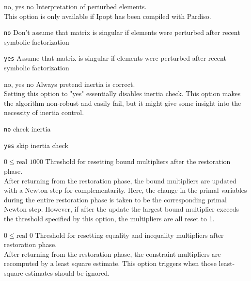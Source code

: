 %
{\ttfamily no, yes}%
{no}%
{Interpretation of perturbed elements.\\
This option is only available if Ipopt has been compiled with Pardiso.}%
{\begin{list}{}{
\setlength{\parsep}{0em}
\setlength{\leftmargin}{5ex}
\setlength{\labelwidth}{2ex}
\setlength{\itemindent}{0ex}
\setlength{\topsep}{0pt}}
\item[\texttt{no}] Don't assume that matrix is singular if elements were perturbed after recent symbolic factorization
\item[\texttt{yes}] Assume that matrix is singular if elements were perturbed after recent symbolic factorization
\end{list}
}

%
{\ttfamily no, yes}%
{no}%
{Always pretend inertia is correct.\\
Setting this option to "yes" essentially disables inertia check. This option makes the algorithm non-robust and easily fail, but it might give some insight into the necessity of inertia control.}%
{\begin{list}{}{
\setlength{\parsep}{0em}
\setlength{\leftmargin}{5ex}
\setlength{\labelwidth}{2ex}
\setlength{\itemindent}{0ex}
\setlength{\topsep}{0pt}}
\item[\texttt{no}] check inertia
\item[\texttt{yes}] skip inertia check
\end{list}
}

%
{$0\leq\textrm{real}$}%
{$1000$}%
{Threshold for resetting bound multipliers after the restoration phase.\\
After returning from the restoration phase, the bound multipliers are updated with a Newton step for complementarity.  Here, the change in the primal variables during the entire restoration phase is taken to be the corresponding primal Newton step. However, if after the update the largest bound multiplier exceeds the threshold specified by this option, the multipliers are all reset to 1.}%
{}

%
{$0\leq\textrm{real}$}%
{$0$}%
{Threshold for resetting equality and inequality multipliers after restoration phase.\\
After returning from the restoration phase, the constraint multipliers are recomputed by a least square estimate.  This option triggers when those least-square estimates should be ignored.}%
{}

